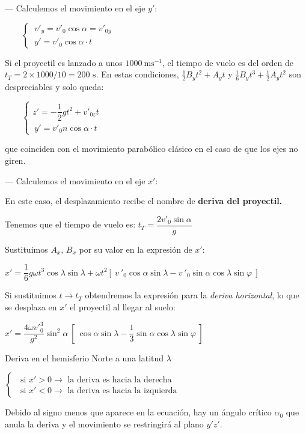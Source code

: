 --- Calculemos el movimiento en el eje $y'$:

$\qquad \begin{cases}
\ v'_y=v'_0 \cos \alpha=v'_{0y} \\ \ y'=v'_0 \cos \alpha \cdot t	
\end{cases}$

Si el proyectil es lanzado a unos $1000\ \text{ms}^{-1}$, el tiempo de vuelo es del orden de $t_T=2 \times  1000 / 10 =200 \text{ s}$. En estas condiciones, $\frac 1 2 B_y t^2+ A_y t$ y $\frac 1 6 B_y t^3+\frac 1 2 A_y t^2$ son despreciables y solo queda:

$\qquad \begin{cases}
z'=-\dfrac 1 2 g t^2+v'_{0z}t \\ \ y'=v'_0n\cos \alpha \cdot t	
\end{cases}\ $ 

que coinciden con el movimiento parabólico clásico en el caso de que los ejes no giren.

--- Calculemos el movimiento en el eje $x'$:

En este caso, el desplazamiento recibe el nombre de \textbf{deriva del proyectil.}

Tenemos que el tiempo de vuelo es:  $t_T=\dfrac{2v'_0\sin \alpha}{g}$

Sustituimos $A_x$, $B_x$ por su valor en la expresión de $x'$:

$x'=\dfrac 1 6 g\omega t^3 \cos \lambda \sin \lambda + \omega t^2 [\ v\ '_0 \cos \alpha \sin \lambda -v\ '_0 \sin \alpha \cos \lambda \sin \varphi  \ ]$

Si sustituimos $t\to t_T$ obtendremos la expresión para la \emph{deriva horizontal}, lo que se desplaza en $x'$ el proyectil al llegar al suelo:

$x'= \dfrac {4 \omega {v'}_0^3}{g^2} \sin^2 \alpha \  \left[ \ \cos \alpha \sin \lambda-\dfrac 1 3 \sin \alpha \cos \lambda \sin \varphi \ \right]$

Deriva en el hemisferio Norte a una latitud $\lambda$

$\begin{cases}
\ \text{ si } x'>0 \to \text{ la deriva es hacia la derecha} \\	
\ \text{ si } x'<0 \to \text{ la deriva es hacia la izquierda}
\end{cases}$

Debido al signo menos que aparece en la ecuación, hay un ángulo crítico $\alpha_0$ que anula la deriva y el movimiento se restringirá al plano $y'z'$.

